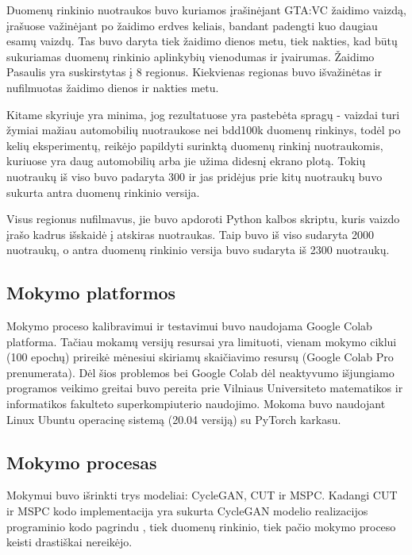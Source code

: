 \documentclass{VUMIFPSkursinis}
\begin{document}
            Duomenų rinkinio nuotraukos buvo kuriamos įrašinėjant GTA:VC žaidimo vaizdą, įrašuose važinėjant po žaidimo erdves keliais, bandant padengti kuo daugiau esamų vaizdų. Tas buvo daryta tiek žaidimo dienos metu, tiek nakties, kad būtų sukuriamas duomenų rinkinio aplinkybių vienodumas ir įvairumas. Žaidimo Pasaulis yra suskirstytas į 8 regionus. Kiekvienas regionas buvo išvažinėtas ir nufilmuotas žaidimo dienos ir nakties metu.
            
            Kitame skyriuje yra minima, jog rezultatuose yra pastebėta spragų - vaizdai turi žymiai mažiau automobilių nuotraukose nei bdd100k duomenų rinkinys, todėl po kelių eksperimentų, reikėjo papildyti surinktą duomenų rinkinį nuotraukomis, kuriuose yra daug automobilių arba jie užima didesnį ekrano plotą. Tokių nuotraukų iš viso buvo padaryta 300 ir jas pridėjus prie kitų nuotraukų buvo sukurta antra duomenų rinkinio versija.
            
            Visus regionus nufilmavus, jie buvo apdoroti Python kalbos skriptu, kuris vaizdo įrašo kadrus išskaidė į atskiras nuotraukas. Taip buvo iš viso sudaryta 2000 nuotraukų, o antra duomenų rinkinio versija buvo sudaryta iš 2300 nuotraukų.
        
        \subsection{Mokymo platformos} %
            Mokymo proceso kalibravimui ir testavimui buvo naudojama Google Colab platforma. Tačiau mokamų versijų resursai yra limituoti, vienam mokymo ciklui (100 epochų) prireikė mėnesiui skiriamų skaičiavimo resursų (Google Colab Pro prenumerata). Dėl šios problemos bei Google Colab dėl neaktyvumo išjungiamo programos veikimo greitai buvo pereita prie Vilniaus Universiteto matematikos ir informatikos fakulteto superkompiuterio naudojimo.
            Mokoma buvo naudojant Linux Ubuntu operacinę sistemą (20.04 versiją) su PyTorch karkasu.
        \subsection{Mokymo procesas} %
            Mokymui buvo išrinkti trys modeliai: CycleGAN, CUT ir MSPC. Kadangi CUT ir MSPC kodo implementacija yra sukurta CycleGAN modelio realizacijos programinio kodo pagrindu \cite{CycleGANRepo}, tiek duomenų rinkinio, tiek pačio mokymo proceso keisti drastiškai nereikėjo. 
\end{document}
